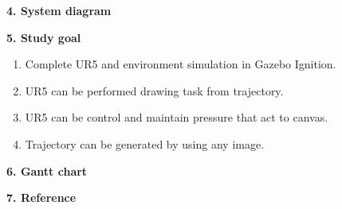 \documentclass[10pt]{article}
\begin{document}
\newpage

\large
\noindent
\textbf{4. System diagram} \\
\normalsize

\large
\noindent
\textbf{5. Study goal} \\
\normalsize
\vspace*{-0.9\baselineskip} 
\begin{enumerate}[nosep, itemsep=-2pt]
    \item Complete UR5 and environment simulation in Gazebo Ignition.
    \item UR5 can be performed drawing task from trajectory.
    \item UR5 can be control and maintain pressure that act to canvas. 
    \item Trajectory can be generated by using any image.
\end{enumerate}
    
\large
\noindent
\textbf{6. Gantt chart} \\
\normalsize

\large
\noindent
\textbf{7. Reference} \\
\normalsize 
\end{document}
